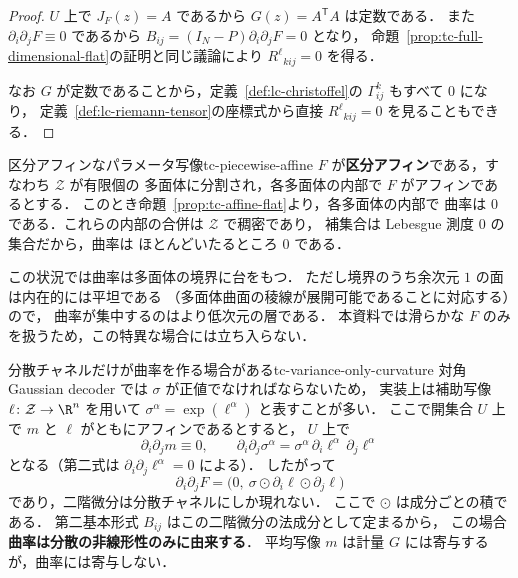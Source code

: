 \begin{proof}
  $U$ 上で $J_F(z)=A$ であるから $G(z)=A^{\mathsf T}A$ は定数である．
  また $\partial_i\partial_jF\equiv0$ であるから
  $B_{ij}=(I_N-P)\partial_i\partial_jF=0$ となり，
  命題~\ref{prop:tc-full-dimensional-flat}の証明と同じ議論により
  $R^\ell{}_{kij}=0$ を得る．

  なお $G$ が定数であることから，定義~\ref{def:lc-christoffel}の
  $\Gamma^k_{ij}$ もすべて $0$ になり，
  定義~\ref{def:lc-riemann-tensor}の座標式から直接
  $R^\ell{}_{kij}=0$ を見ることもできる．
\end{proof}

\begin{remark}{区分アフィンなパラメータ写像}{tc-piecewise-affine}
  $F$ が\textbf{区分アフィン}である，すなわち $\mathcal{Z}$ が有限個の
  多面体に分割され，各多面体の内部で $F$ がアフィンであるとする．
  このとき命題~\ref{prop:tc-affine-flat}より，各多面体の内部で
  曲率は $0$ である．これらの内部の合併は $\mathcal{Z}$ で稠密であり，
  補集合は Lebesgue 測度 $0$ の集合だから，曲率は
  ほとんどいたるところ $0$ である．

  この状況では曲率は多面体の境界に台をもつ．
  ただし境界のうち余次元 $1$ の面は内在的には平坦である
  （多面体曲面の稜線が展開可能であることに対応する）ので，
  曲率が集中するのはより低次元の層である．
  本資料では滑らかな $F$ のみを扱うため，この特異な場合には立ち入らない．
\end{remark}

\begin{remark}{分散チャネルだけが曲率を作る場合がある}{tc-variance-only-curvature}
  対角 Gaussian decoder では $\sigma$ が正値でなければならないため，
  実装上は補助写像 $\ell\colon\mathcal{Z}\to\R^n$ を用いて
  $\sigma^\alpha=\exp(\ell^\alpha)$ と表すことが多い．
  ここで開集合 $U$ 上で $m$ と $\ell$ がともにアフィンであるとすると，
  $U$ 上で
  \[
    \partial_i\partial_jm\equiv0,
    \qquad
    \partial_i\partial_j\sigma^\alpha
    =\sigma^\alpha\,\partial_i\ell^\alpha\,\partial_j\ell^\alpha
  \]
  となる（第二式は $\partial_i\partial_j\ell^\alpha=0$ による）．
  したがって
  \[
    \partial_i\partial_jF
    =\bigl(0,\ \sigma\odot\partial_i\ell\odot\partial_j\ell\bigr)
  \]
  であり，二階微分は分散チャネルにしか現れない．
  ここで $\odot$ は成分ごとの積である．
  第二基本形式 $B_{ij}$ はこの二階微分の法成分として定まるから，
  この場合\textbf{曲率は分散の非線形性のみに由来する}．
  平均写像 $m$ は計量 $G$ には寄与するが，曲率には寄与しない．
\end{remark}

